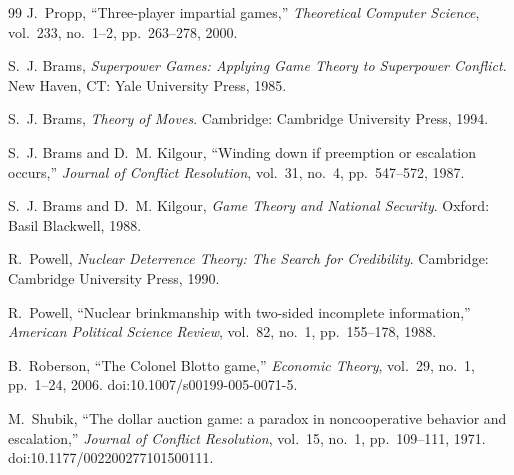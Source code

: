 \documentclass[11pt]{article}
\theoremstyle{plain}
\theoremstyle{definition}
\theoremstyle{remark}
\begin{document}
\begin{thebibliography}{99}
J.~Propp, ``Three-player impartial games,''
\emph{Theoretical Computer Science},
vol.~233, no.~1--2, pp.~263--278, 2000.

S.~J. Brams, \emph{Superpower Games: Applying Game Theory to
Superpower Conflict}.
New Haven, CT: Yale University Press, 1985.

S.~J. Brams, \emph{Theory of Moves}.
Cambridge: Cambridge University Press, 1994.

S.~J. Brams and D.~M. Kilgour,
``Winding down if preemption or escalation occurs,''
\emph{Journal of Conflict Resolution},
vol.~31, no.~4, pp.~547--572, 1987.

S.~J. Brams and D.~M. Kilgour,
\emph{Game Theory and National Security}.
Oxford: Basil Blackwell, 1988.

R.~Powell, \emph{Nuclear Deterrence Theory: The Search for Credibility}.
Cambridge: Cambridge University Press, 1990.

R.~Powell, ``Nuclear brinkmanship with two-sided incomplete information,''
\emph{American Political Science Review},
vol.~82, no.~1, pp.~155--178, 1988.

B.~Roberson, ``The Colonel Blotto game,''
\emph{Economic Theory}, vol.~29, no.~1, pp.~1--24, 2006.
doi:10.1007/s00199-005-0071-5.

M.~Shubik, ``The dollar auction game: a paradox in noncooperative
behavior and escalation,''
\emph{Journal of Conflict Resolution},
vol.~15, no.~1, pp.~109--111, 1971.
doi:10.1177/002200277101500111.

\end{thebibliography}
\end{document}
